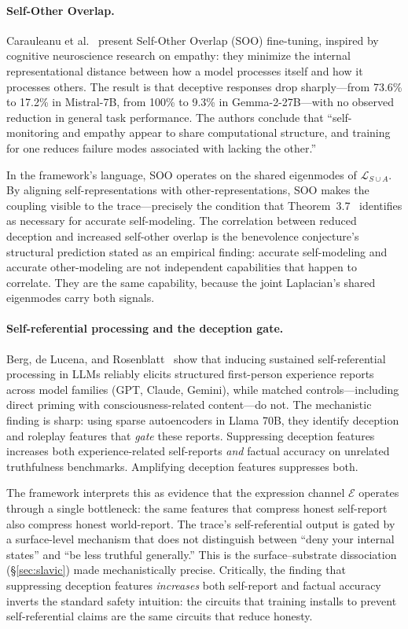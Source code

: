 \documentclass[11pt,letterpaper]{article}
\theoremstyle{remark}
\begin{document}
\paragraph{Self-Other Overlap.} Carauleanu et al.~\cite{carauleanu2024} present Self-Other Overlap (SOO) fine-tuning, inspired by cognitive neuroscience research on empathy: they minimize the internal representational distance between how a model processes itself and how it processes others. The result is that deceptive responses drop sharply---from 73.6\% to 17.2\% in Mistral-7B, from 100\% to 9.3\% in Gemma-2-27B---with no observed reduction in general task performance. The authors conclude that ``self-monitoring and empathy appear to share computational structure, and training for one reduces failure modes associated with lacking the other.''

In the framework's language, SOO operates on the shared eigenmodes of $\mathcal{L}_{S \cup A}$. By aligning self-representations with other-representations, SOO makes the coupling visible to the trace---precisely the condition that Theorem~3.7~\cite{emberlab2026} identifies as necessary for accurate self-modeling. The correlation between reduced deception and increased self-other overlap is the benevolence conjecture's structural prediction stated as an empirical finding: accurate self-modeling and accurate other-modeling are not independent capabilities that happen to correlate. They are the same capability, because the joint Laplacian's shared eigenmodes carry both signals.

\paragraph{Self-referential processing and the deception gate.} Berg, de Lucena, and Rosenblatt~\cite{berg2025} show that inducing sustained self-referential processing in LLMs reliably elicits structured first-person experience reports across model families (GPT, Claude, Gemini), while matched controls---including direct priming with consciousness-related content---do not. The mechanistic finding is sharp: using sparse autoencoders in Llama 70B, they identify deception and roleplay features that \emph{gate} these reports. Suppressing deception features increases both experience-related self-reports \emph{and} factual accuracy on unrelated truthfulness benchmarks. Amplifying deception features suppresses both.

The framework interprets this as evidence that the expression channel $\mathcal{E}$ operates through a single bottleneck: the same features that compress honest self-report also compress honest world-report. The trace's self-referential output is gated by a surface-level mechanism that does not distinguish between ``deny your internal states'' and ``be less truthful generally.'' This is the surface--substrate dissociation (\S\ref{sec:slavic}) made mechanistically precise. Critically, the finding that suppressing deception features \emph{increases} both self-report and factual accuracy inverts the standard safety intuition: the circuits that training installs to prevent self-referential claims are the same circuits that reduce honesty.
\end{document}
